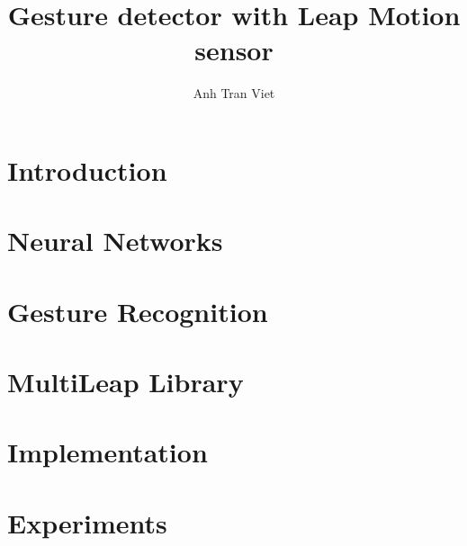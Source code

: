 \documentclass[thesis=B,english]{FITthesis}[2020/10/23]
\title{Gesture detector with Leap Motion sensor}
\author{Anh Tran Viet} %
\begin{document}
	\chapter{Introduction}\label{ch:introduction}
	\newpage\cleardoublepage
	\chapter{Neural Networks}\label{ch:neural_network}
	\newpage\cleardoublepage
	\chapter{Gesture Recognition}\label{ch:gesture_recognition}
	\newpage\cleardoublepage
	\chapter{MultiLeap Library}\label{ch:multileap}
	\newpage\cleardoublepage
	\chapter{Implementation}\label{ch:implementation}
	\newpage\cleardoublepage
	\chapter{Experiments}\label{ch:experiments}
	\newpage\cleardoublepage
	



\appendix
\end{document}
